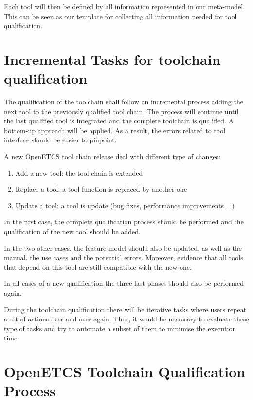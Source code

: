 Each tool will then be defined by all information represented in our
meta-model. This can be seen as our template for collecting all
information needed for tool qualification.



\section{Incremental Tasks for toolchain qualification}
\label{sec:incremental}
The qualification of the toolchain shall follow an incremental process
adding the next tool to the previously qualified tool chain. The
process will continue until the last qualified tool is integrated and
the complete toolchain is qualified. A bottom-up approach will be
applied. As a result, the errors related to tool interface should be
easier to pinpoint.

A new  OpenETCS tool chain release deal with different type of changes:
\begin{enumerate} 
\item Add a new tool: the tool chain is extended
\item Replace a tool: a tool function is replaced by another one
\item Update a tool: a tool is update (bug fixes, performance
  improvements ...)
\end{enumerate}

In the first case, the complete qualification process should be
performed and the qualification of the new tool should be added.

In the two other cases, the feature model should also be updated, as
well as the manual, the use cases and the potential  errors.
Moreover, evidence that all tools that depend on this tool are still
compatible with the new one.  

In all cases of a new qualification  the three last phases should also be
performed again.

During the toolchain qualification there will be iterative tasks where
users repeat a set of actions over and over again. Thus, it would be
necessary to evaluate these type of tasks and try to automate a subset
of them to minimise the execution time.


\section{OpenETCS Toolchain Qualification Process}
\label{sec:toolchain-qualification-process}

